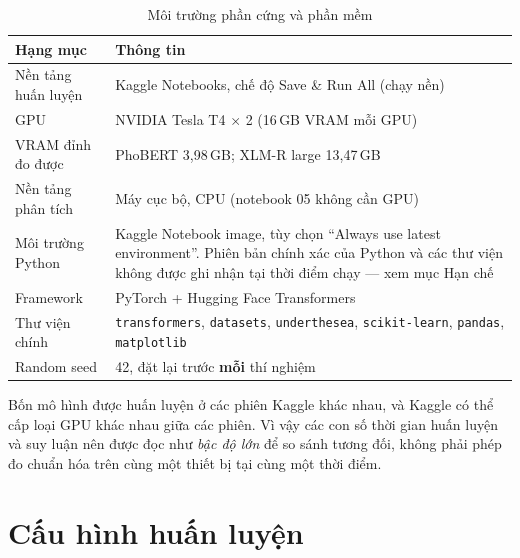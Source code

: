 \documentclass[12pt,a4paper,oneside]{report}
\begin{document}
\begin{table}[H]
\centering
\caption{Môi trường phần cứng và phần mềm}
\begin{tabularx}{\textwidth}{@{}L{4.0cm}Y@{}}
\toprule
Hạng mục & Thông tin \\
\midrule
Nền tảng huấn luyện & Kaggle Notebooks, chế độ Save \& Run All (chạy nền) \\
GPU & NVIDIA Tesla T4 $\times$ 2 (16\,GB VRAM mỗi GPU) \\
VRAM đỉnh đo được & PhoBERT 3,98\,GB; XLM-R large 13,47\,GB \\
Nền tảng phân tích & Máy cục bộ, CPU (notebook 05 không cần GPU) \\
Môi trường Python & Kaggle Notebook image, tùy chọn ``Always use latest
                    environment''. Phiên bản chính xác của Python và các thư viện
                    không được ghi nhận tại thời điểm chạy --- xem mục Hạn chế \\
Framework & PyTorch + Hugging Face Transformers \\
Thư viện chính & \texttt{transformers}, \texttt{datasets}, \texttt{underthesea},
                 \texttt{scikit-learn}, \texttt{pandas}, \texttt{matplotlib} \\
Random seed & 42, đặt lại trước \textbf{mỗi} thí nghiệm \\
\bottomrule
\end{tabularx}
\end{table}

\begin{notebox}
Bốn mô hình được huấn luyện ở các phiên Kaggle khác nhau, và Kaggle có thể cấp loại GPU
khác nhau giữa các phiên. Vì vậy các con số thời gian huấn luyện và suy luận nên được đọc
như \textit{bậc độ lớn} để so sánh tương đối, không phải phép đo chuẩn hóa trên cùng một
thiết bị tại cùng một thời điểm.
\end{notebox}

\section{Cấu hình huấn luyện}
\end{document}
